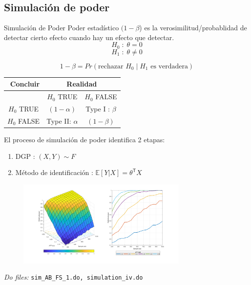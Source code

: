 \documentclass[8pt]{beamer}
\begin{document}
\subsection{Simulación de poder}
\begin{frame}[allowframebreaks]{Simulación de Poder}
    Poder estadístico $(1-\beta$) es la verosimilitud/probablidad de detectar cierto efecto cuando hay un efecto que detectar.\\
    
    \[H_0\;:\;\theta = 0\]
    \[H_1\;:\;\theta \neq 0\]
    
    \[1-\beta = Pr(\text{rechazar } H_0\;|\;H_1 \text{ es verdadera}) \]
    
   
\begin{table}[H]
  \centering
    \begin{tabular}{l|cc}
    \toprule
    \multicolumn{1}{r}{Concluir} & \multicolumn{2}{c}{Realidad} \\
    \midrule
    \midrule
     & $H_0$ TRUE & $H_0$ FALSE \\
     \midrule
    \multicolumn{1}{c|}{$H_0$ TRUE} & $(1-\alpha)$ & Type I : $\beta$ \\
    $H_0$ FALSE & Type II: $\alpha$ & $(1-\beta)$ \\
    \bottomrule
    \end{tabular}%
\end{table}%

\framebreak

El proceso de simulación de poder identifica 2 etapas:
\begin{enumerate}
    \item DGP :  $(X,Y)\sim F$
    \item Método de identificación  : $\mathbb{E}[Y|X]=\theta^{\mathsf{T}}X$
\end{enumerate}

\begin{figure}[H]
    \begin{center}
        \includegraphics[width=0.75\textwidth]{Figuras/pwr_AB_FS_4.pdf}
        \end{center}
\end{figure}
    
{\footnotesize \textit{Do files: } \texttt{sim\_AB\_FS\_1.do, simulation\_iv.do}}    
    
\end{frame}
\end{document}
